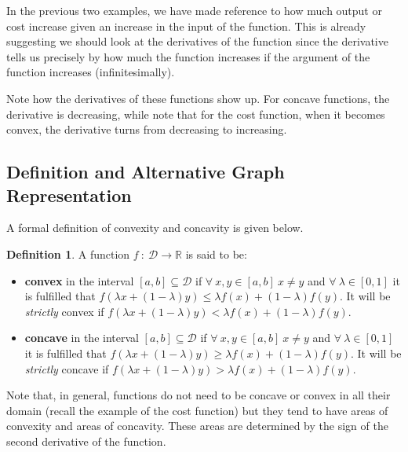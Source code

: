 \documentclass[a4paper,11pt]{article}
\theoremstyle{definition}
\newtheorem{definition}{Definition}
\theoremstyle{plain}
\begin{document}
    In the previous two examples, we have made reference to how much output
or cost increase given an increase in the input of the function. This is
already suggesting we should look at the derivatives of the function
since the derivative tells us precisely by how much the function
increases if the argument of the function increases (infinitesimally).

Note how the derivatives of these functions show up. For concave
functions, the derivative is decreasing, while note that for the cost
function, when it becomes convex, the derivative turns from decreasing
to increasing.

\subsection{Definition and Alternative Graph
Representation}\label{definition-and-alternative-graph-representation}

A formal definition of convexity and concavity is given below.

\begin{definition}
A function \(f \: : \: \mathcal{D} \rightarrow \mathbb{R}\) is said to be: 

\begin{itemize}
    \item \textbf{convex} in the interval \([a,b]\subseteq\mathcal{D}\) if \(\forall \: x,y\in[a,b] \: x\neq y\) and \(\forall \: \lambda\in[0, 1]\) it is fulfilled that \(f\left(\lambda x + (1-\lambda)y\right) \leq \lambda f(x) + (1-\lambda) f(y)\). It will be \emph{strictly} convex if \(f\left(\lambda x + (1-\lambda)y\right) < \lambda f(x) + (1-\lambda) f(y)\).

    \item \textbf{concave} in the interval \([a,b]\subseteq\mathcal{D}\) if \(\forall \: x,y\in[a,b] \: x\neq y\) and \(\forall \: \lambda\in[0,1]\) it is fulfilled that \(f(\lambda x + (1-\lambda) y)\geq \lambda f(x) + (1-\lambda) f(y)\). It will be \emph{strictly} concave if \(f\left(\lambda x + (1-\lambda)y\right) > \lambda f(x) + (1-\lambda) f(y)\).
\end{itemize}
\end{definition}

Note that, in general, functions do not need to be concave or convex in
all their domain (recall the example of the cost function) but they tend
to have areas of convexity and areas of concavity. These areas are
determined by the sign of the second derivative of the function.
\end{document}
